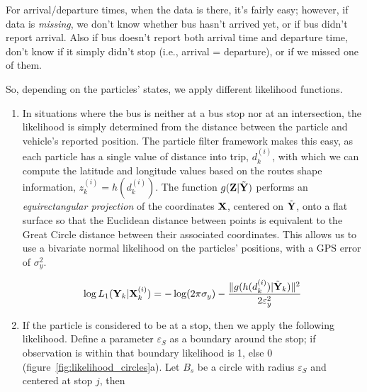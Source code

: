 \documentclass[draftcls,a4paper,onecolumn]{IEEEtran}\usepackage[]{graphicx}\usepackage[]{color}
\begin{document}
For arrival/departure times, when the data is there, it's fairly easy;
however, if data is \emph{missing}, we don't know whether bus hasn't arrived yet,
or if bus didn't report arrival.
Also if bus doesn't report both arrival time and departure time,
don't know if it simply didn't stop (i.e., arrival = departure),
or if we missed one of them.

So, depending on the particles' states, we apply different likelihood functions.

\begin{enumerate}
\item
In situations where the bus is neither at a bus stop nor at an intersection,
the likelihood is simply determined from the distance between the particle and 
vehicle's reported position.
The particle filter framework makes this easy,
as each particle has a single value of distance into trip, $d_k^{(i)}$,
with which we can compute the latitude and longitude values based on 
the routes shape information, $z_k^{(i)} = h(d_k^{(i)})$.
The function $g (\mathbf{Z} | \tilde{\mathbf{Y}})$ performs an \emph{equirectangular projection} \cite{Snyder_1998}
of the coordinates $\mathbf{X}$, centered on $\tilde{\mathbf{Y}}$, 
onto a flat surface so that the Euclidean distance between points is equivalent
to the Great Circle distance between their associated coordinates.
This allows us to use a bivariate normal likelihood on the particles' positions,
with a GPS error of $\sigma_y^2$.

\begin{equation}
  \label{eq:l1}
  \log L_1 (\mathbf{Y}_k | \mathbf{X}_k^{(i)}) = - \log(2\pi\sigma_y) - \frac{\|g(h(d_k^{(i)})|\tilde{\mathbf{Y}}_k)\|^2}{2\varepsilon_y^2}
\end{equation}


\item
If the particle is considered to be at a stop, then we apply the following likelihood.
Define a parameter $\varepsilon_S$ as a boundary around the stop;
if observation is within that boundary likelihood is 1, else 0 (figure~\ref{fig:likelihood_circles}a).
Let $B_s$ be a circle with radius $\varepsilon_S$ and centered at stop $j$, then


\end{enumerate}
\end{document}
